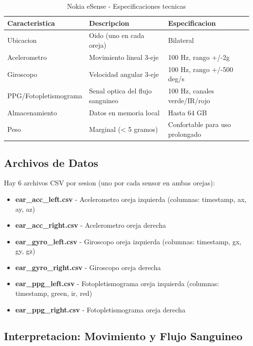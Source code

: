 \begin{table}[H]
\centering
\caption{Nokia eSense - Especificaciones tecnicas}
\begin{tabular}{|p{3.5cm}|p{4cm}|p{3cm}|}
\hline
\textbf{Caracteristica} & \textbf{Descripcion} & \textbf{Especificacion} \\
\hline
Ubicacion & Oido (uno en cada oreja) & Bilateral \\
\hline
Acelerometro & Movimiento lineal 3-eje & 100 Hz, rango +/-2g \\
\hline
Giroscopo & Velocidad angular 3-eje & 100 Hz, rango +/-500 deg/s \\
\hline
PPG/Fotopletismograma & Senal optica del flujo sanguineo & 100 Hz, canales verde/IR/rojo \\
\hline
Almacenamiento & Datos en memoria local & Hasta 64 GB \\
\hline
Peso & Marginal (< 5 gramos) & Confortable para uso prolongado \\
\hline
\end{tabular}
\end{table}

\subsection{Archivos de Datos}

Hay 6 archivos CSV por sesion (uno por cada sensor en ambas orejas):

\begin{itemize}
    \item \textbf{ear\_acc\_left.csv} - Acelerometro oreja izquierda (columnas: timestamp, ax, ay, az)
    \item \textbf{ear\_acc\_right.csv} - Acelerometro oreja derecha
    \item \textbf{ear\_gyro\_left.csv} - Giroscopo oreja izquierda (columnas: timestamp, gx, gy, gz)
    \item \textbf{ear\_gyro\_right.csv} - Giroscopo oreja derecha
    \item \textbf{ear\_ppg\_left.csv} - Fotopletismograma oreja izquierda (columnas: timestamp, green, ir, red)
    \item \textbf{ear\_ppg\_right.csv} - Fotopletismograma oreja derecha
\end{itemize}

\subsection{Interpretacion: Movimiento y Flujo Sanguineo}

